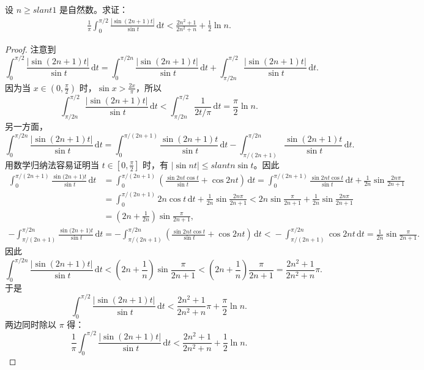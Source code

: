 \documentclass[../../main.tex]{subfiles}
\begin{document}
\begin{example}
设 \( n \geqslant slant 1 \) 是自然数。求证：
\begin{align*}
\frac{1}{\pi} \int_{0}^{\pi/2} \frac{|\sin(2n + 1)t|}{\sin t} \, \mathrm{d}t < \frac{2n^2 + 1}{2n^2 + n} + \frac{1}{2} \ln n.
\end{align*}
\end{example}
\begin{proof}
注意到
\[
\int_{0}^{\pi/2} \frac{|\sin(2n + 1)t|}{\sin t} \, \mathrm{d}t = \int_{0}^{\pi/2n} \frac{|\sin(2n + 1)t|}{\sin t} \, \mathrm{d}t + \int_{\pi/2n}^{\pi/2} \frac{|\sin(2n + 1)t|}{\sin t} \, \mathrm{d}t.
\]
因为当 \( x \in \left( 0, \frac{\pi}{2} \right) \) 时，\( \sin x > \frac{2x}{\pi} \)，所以
\[
\int_{\pi/2n}^{\pi/2} \frac{|\sin(2n + 1)t|}{\sin t} \, \mathrm{d}t < \int_{\pi/2n}^{\pi/2} \frac{1}{2t/\pi} \, \mathrm{d}t = \frac{\pi}{2} \ln n.
\]
另一方面，
\[
\int_{0}^{\pi/2n} \frac{|\sin(2n + 1)t|}{\sin t} \, \mathrm{d}t = \int_{0}^{\pi/(2n + 1)} \frac{\sin(2n + 1)t}{\sin t} \, \mathrm{d}t - \int_{\pi/(2n + 1)}^{\pi/2n} \frac{\sin(2n + 1)t}{\sin t} \, \mathrm{d}t.
\]
用数学归纳法容易证明当 \( t \in \left[ 0, \frac{\pi}{2} \right] \) 时，有 \( |\sin nt| \leqslant slant n \sin t \)。因此
\begin{align*}
\int_0^{\pi/(2n+1)}{\frac{\sin\mathrm{(}2n+1)t}{\sin t}\,\mathrm{d}t}&=\int_0^{\pi/(2n+1)}{\left( \frac{\sin 2nt\cos t}{\sin t}+\cos 2nt \right) \,\mathrm{d}t=\int_0^{\pi/(2n+1)}{\frac{\sin 2nt\cos t}{\sin t}\,\mathrm{d}t}}+\frac{1}{2n}\sin \frac{2n\pi}{2n+1}
\\
&=\int_0^{\pi/(2n+1)}{2n\cos t\,\mathrm{d}t}+\frac{1}{2n}\sin \frac{2n\pi}{2n+1}<2n\sin \frac{\pi}{2n+1}+\frac{1}{2n}\sin \frac{2n\pi}{2n+1}
\\
&=\left( 2n+\frac{1}{2n} \right) \sin \frac{\pi}{2n+1},
\end{align*}
\begin{align*}
-\int_{\pi/(2n+1)}^{\pi/2n}{\frac{\sin\mathrm{(}2n+1)t}{\sin t}\,\mathrm{d}t}=-\int_{\pi/(2n+1)}^{\pi/2n}{\left( \frac{\sin 2nt\cos t}{\sin t}+\cos 2nt \right) \,\mathrm{d}t<}-\int_{\pi/(2n+1)}^{\pi/2n}{\cos 2nt\,\mathrm{d}t=\frac{1}{2n}\sin \frac{\pi}{2n+1}.}
\end{align*}
因此
\[
\int_{0}^{\pi/2n} \frac{|\sin(2n + 1)t|}{\sin t} \, \mathrm{d}t < \left( 2n + \frac{1}{n} \right) \sin \frac{\pi}{2n + 1} < \left( 2n + \frac{1}{n} \right) \frac{\pi}{2n + 1} = \frac{2n^2 + 1}{2n^2 + n} \pi.
\]
于是
\[
\int_{0}^{\pi/2} \frac{|\sin(2n + 1)t|}{\sin t} \, \mathrm{d}t < \frac{2n^2 + 1}{2n^2 + n} \pi + \frac{\pi}{2} \ln n.
\]
两边同时除以 \( \pi \) 得：
\[
\frac{1}{\pi} \int_{0}^{\pi/2} \frac{|\sin(2n + 1)t|}{\sin t} \, \mathrm{d}t < \frac{2n^2 + 1}{2n^2 + n} + \frac{1}{2} \ln n.
\]
\end{proof}
\end{document}
